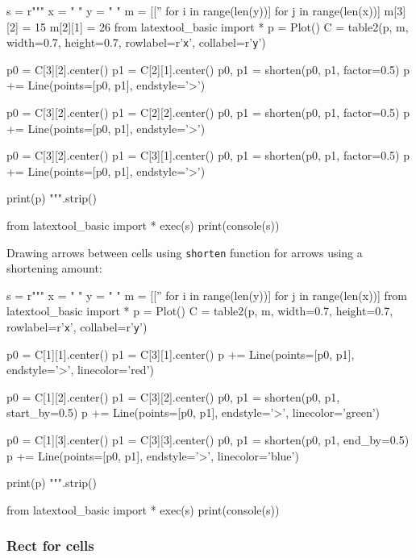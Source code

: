 \begin{python}
s = r"""
x = "     "
y = "      "
m = [['' for i in range(len(y))] for j in range(len(x))]
m[3][2] = 15
m[2][1] = 26
from latextool_basic import *
p = Plot()
C = table2(p, m, width=0.7, height=0.7,
           rowlabel=r'\texttt{x}', collabel=r'\texttt{y}')
           
p0 = C[3][2].center()
p1 = C[2][1].center()
p0, p1 = shorten(p0, p1, factor=0.5)
p += Line(points=[p0, p1], endstyle='>')

p0 = C[3][2].center()
p1 = C[2][2].center()
p0, p1 = shorten(p0, p1, factor=0.5)
p += Line(points=[p0, p1], endstyle='>')

p0 = C[3][2].center()
p1 = C[3][1].center()
p0, p1 = shorten(p0, p1, factor=0.5)
p += Line(points=[p0, p1], endstyle='>')

print(p)
""".strip()

from latextool_basic import *
exec(s)
print(console(s))
\end{python}





\newpage
Drawing arrows between cells using \texttt{shorten} function for arrows
using a shortening amount:

\begin{python}
s = r"""
x = "     "
y = "      "
m = [['' for i in range(len(y))] for j in range(len(x))]
from latextool_basic import *
p = Plot()
C = table2(p, m, width=0.7, height=0.7,
           rowlabel=r'\texttt{x}', collabel=r'\texttt{y}')
           
p0 = C[1][1].center()
p1 = C[3][1].center()
p += Line(points=[p0, p1], endstyle='>', linecolor='red')

p0 = C[1][2].center()
p1 = C[3][2].center()
p0, p1 = shorten(p0, p1, start_by=0.5)
p += Line(points=[p0, p1], endstyle='>', linecolor='green')

p0 = C[1][3].center()
p1 = C[3][3].center()
p0, p1 = shorten(p0, p1, end_by=0.5)
p += Line(points=[p0, p1], endstyle='>', linecolor='blue')

print(p)
""".strip()

from latextool_basic import *
exec(s)
print(console(s))
\end{python}





\newpage
\subsubsection{Rect for cells}

